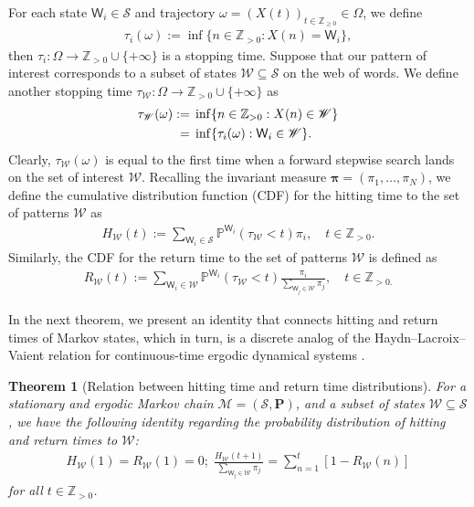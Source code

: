 \documentclass[10pt,journal,compsoc]{IEEEtran}
\newtheorem{theorem}{Theorem}
\begin{document}
For each state $ \mathsf W_i\in\mathscr S$ and trajectory $\omega=(X(t))_{t\in\mathbb Z_{\geq0}}\in\varOmega $, we define \begin{align} \tau_i(\omega):=\inf\{n\in\mathbb Z_{>0}:X(n)=\mathsf W_i\},\end{align} then  $ \tau_{i}:\varOmega\longrightarrow\mathbb Z_{>0}\cup\{+\infty\}$ is a stopping time. Suppose that our pattern  of interest corresponds to a subset of states $ \mathscr W\subseteq\mathscr S$ on the web of words. We  define another stopping time $ \tau_{\mathscr W}:\varOmega\longrightarrow\mathbb Z_{>0}\cup\{+\infty\}$ as\begin{align}
\tau_{\mathscr W}(\omega):={}&\inf\{n\in\mathbb Z_{>0}:X(n)\in \mathscr W\}\notag\\={}&\inf\{\tau_i(\omega):\mathsf W_i\in\mathscr W\}.
\end{align}Clearly, $ \tau_{\mathscr W}(\omega)$ is equal to  the first time when a forward stepwise search lands on the set of interest $ \mathscr W$.
Recalling the invariant measure  $ \bm\pi=(\pi_1,\dots ,\pi_N)$, we  define the cumulative distribution function (CDF) for the hitting time to the set of patterns  $ \mathscr W$ as\begin{align}
H_{\mathscr W}(t):=\sum_{\mathsf W_i\in\mathscr S}\mathbb P^{\mathsf W_i}(\tau_{\mathscr W}< t)\pi_i,\quad t\in\mathbb Z_{>0}.\label{eq:H_A_defn}
\end{align} Similarly, the CDF for the return time  to the set of patterns  $ \mathscr W$ is defined as \begin{align}
R_{\mathscr W}(t):=\sum_{\mathsf W_i\in\mathscr W}\mathbb P^{\mathsf W_i}(\tau_{  \mathscr W}< t)\frac{\pi_i}{\sum_{\mathsf W_j\in\mathscr W}\pi_j},\quad t\in\mathbb Z_{>0.}\label{eq:R_A_defn}
\end{align}

In the next theorem, we present an identity that connects  hitting and return times of Markov states, which in turn, is a discrete analog of the Haydn--Lacroix--Vaient relation for  continuous-time ergodic dynamical systems  \cite{HaydnLacroixVaienti2005}.

\begin{theorem}[Relation between hitting time and return time distributions]\label{thm:H_R_rln}For a  stationary and ergodic Markov chain  $ \mathscr M=(\mathscr S,\mathbf P)$, and a subset of states $ \mathscr W\subseteq\mathscr S$, we have the following identity regarding the probability distribution of hitting and return times to $ \mathscr W$:\begin{align}H_{\mathscr W}(1)=R_{\mathscr W}(1)=0;\;
\frac{H_{\mathscr W}(t+1)}{\sum_{\mathsf W_j\in\mathscr W}\pi_j}=\sum_{ n=1}^t[1-R_{\mathscr W}(n)]\label{eq:H_R_rln}
\end{align}for all $t\in\mathbb Z_{>0}$.\end{theorem}
\end{document}
